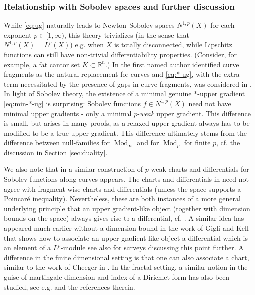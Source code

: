 \documentclass{amsart}
\numberwithin{equation}{section}
\newcommand{\R}{\mathbb{R}}
\newcommand{\Mod}{\operatorname{Mod}}
\begin{document}
\subsubsection*{Relationship with Sobolev spaces and further discussion} While \eqref{eq:ug} naturally leads to Newton--Sobolev spaces $N^{1,p}(X)$ for each exponent $p\in [1,\infty)$, this theory trivializes (in the sense that $N^{1,p}(X)=L^p(X)$) e.g. when $X$ is totally disconnected, while Lipschitz functions can still have non-trivial differentiability properties. (Consider, for example, a fat cantor set $K\subset \R^n$.) In \cite{bate15} the first named author identified curve fragments as the natural replacement for curves and \eqref{eq:*-ug}, with the extra term necessitated by the presence of gaps in curve fragments, was considered in \cite{bate18,bkt19}. In light of Sobolev theory, the existence of a minimal genuine $\ast$-upper gradient \eqref{eq:min-*-ug} is surprising: Sobolev functions $f\in N^{1,p}(X)$ need not have minimal upper gradients - only a minimal $p$-\emph{weak} upper gradient. This difference is small, but arises in many proofs, as a relaxed upper gradient always has to be modified to be a true upper gradient. This difference ultimately stems from the difference between null-families for $\Mod_\infty$ and for $\Mod_p$ for finite $p$, cf. the discussion in Section \ref{sec:duality}.

We also note that in \cite{teriseb} a similar construction of $p$-weak charts and differentials for Sobolev functions along curves appears. The charts and differentials in \cite{teriseb} need not agree with fragment-wise charts and differentials (unless the space supports a Poincar\'e inequality). Nevertheless, these are both instances of a more general underlying principle that an upper gradient-like object (together with dimension bounds on the space) always gives rise to a differential, cf. \cite{eidconj,teriseb,bkt19}. A similar idea has appeared much earlier without a dimension bound in the work of Gigli and Kell that shows how to associate an upper gradient-like object a differential which is an element of a $L^p$-module \cite{gig15, kell} see also \cite{AIDP1, AIDP2} for surveys discussing this point further. A difference in the finite dimensional setting is that one can also associate a chart, similar to the work of Cheeger in \cite{che99}. In the fractal setting, a similar notion in the guise of martingale dimension and index of a Dirichlet form has also been studied, see e.g. \cite{hino} and the references therein.
\end{document}
